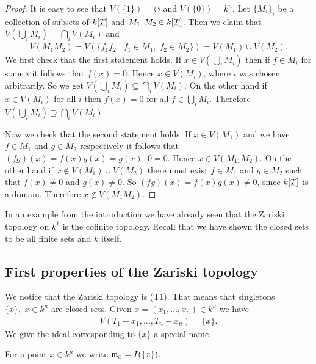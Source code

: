 \documentclass[../notes.tex]{subfiles}
\begin{document}
\begin{proof}
  It is easy to see that $V(\{1\}) = \varnothing$ and $V(\{0\}) = k^n$.
  Let $\{M_i\}_{i}$ be a collection of subsets of $k[{\underline{T}}]$ and $M_1, M_2 \in k[{\underline{T}}]$.
  Then we claim that $V(\bigcup_i M_i) = \bigcap_i V(M_i)$ and
  \begin{align*}
    V(M_1M_2) = V(\{f_1f_2 \mid f_1 \in M_1, \; f_2 \in M_2 \}) = V(M_1) \cup V(M_2).
  \end{align*}
  We first check that the first statement holds. If $x \in V(\bigcup_ i M_i)$
  then if $f \in M_i$ for some $i$ it follows that $f(x) = 0$. Hence $x \in V(M_i)$,
  where $i$ was chosen arbitrarily. So we get $V(\bigcup_i M_i) \subseteq \bigcap_i V(M_i)$.
  On the other hand if $x \in V(M_i)$ for all $i$ then $f(x) = 0$ for all $f \in \bigcup_i M_i$.
  Therefore $V(\bigcup_i M_i) \supseteq \bigcap_i V(M_i)$.

  \noindent Now we check that the second statement holds. If $x \in V(M_1)$ and we have
  $f \in M_1$ and $g \in M_2$ respectively it follows that
  $(fg)(x) = f(x)g(x) = g(x) \cdot 0 = 0$. Hence $x \in V(M_11M_2)$.
  On the other hand if $x \notin V(M_1) \cup V(M_2)$ there must exist $f \in M_1$ and
  $g \in M_2$ such that $f(x) \neq 0$ and $g(x) \neq 0$. So $(fg)(x) = f(x) g(x) \neq 0$,
  since $k[{\underline{T}}]$ is a domain. Therefore $x \notin V(M_1 M_2)$.
  
\end{proof}

\begin{ex}{}{}
  In an example from the introduction we have already seen that the Zariski topology on
  $k^1$ is the cofinite topology. Recall that we have shown the closed sets to be all finite
  sets and $k$ itself.
\end{ex}

\subsection{First properties of the Zariski topology}

We notice that the Zariski topology is (T1). That means that singletons $\{x\}, \; x \in k^n$
are closed sets. Given $x = (x_1, \dots, x_n)\in k^n$ we have
\begin{align*}
  V(T_1 - x_1, \dots, T_n - x_n) = \{x\}.
\end{align*}
We give the ideal corresponding to $\{x\}$ a special name.

\smallskip
\begin{defi}{}{}
  For a point $x \in k^n$ we write ${\mathfrak{m}}_x = I(\{x\})$.
\end{defi}
\end{document}

